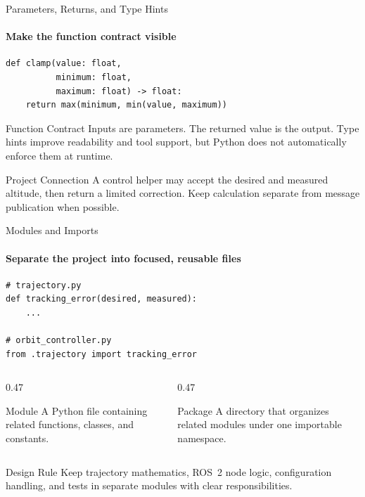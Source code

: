 \begin{frame}[fragile]{Parameters, Returns, and Type Hints}
\framesubtitle{Make the function contract visible}
\begin{verbatim}
def clamp(value: float,
          minimum: float,
          maximum: float) -> float:
    return max(minimum, min(value, maximum))
\end{verbatim}
\begin{block}{Function Contract}
Inputs are parameters. The returned value is the output. Type hints improve readability and tool support, but Python does not automatically enforce them at runtime.
\end{block}
\begin{exampleblock}{Project Connection}
A control helper may accept the desired and measured altitude, then return a limited correction. Keep calculation separate from message publication when possible.
\end{exampleblock}
\end{frame}

\begin{frame}[fragile]{Modules and Imports}
\framesubtitle{Separate the project into focused, reusable files}
\begin{verbatim}
# trajectory.py
def tracking_error(desired, measured):
    ...

# orbit_controller.py
from .trajectory import tracking_error
\end{verbatim}
\begin{columns}[T,onlytextwidth]
\begin{column}{0.47\textwidth}
\begin{block}{Module}
A Python file containing related functions, classes, and constants.
\end{block}
\end{column}
\hfill
\begin{column}{0.47\textwidth}
\begin{block}{Package}
A directory that organizes related modules under one importable namespace.
\end{block}
\end{column}
\end{columns}
\begin{exampleblock}{Design Rule}
Keep trajectory mathematics, ROS~2 node logic, configuration handling, and tests in separate modules with clear responsibilities.
\end{exampleblock}
\end{frame}

